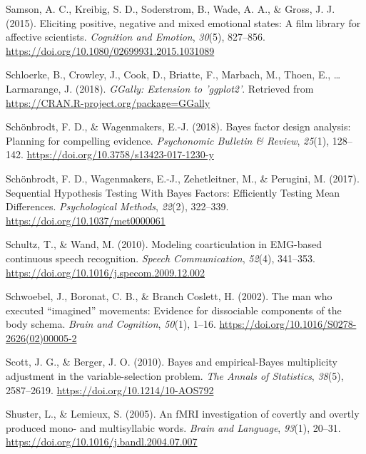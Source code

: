 \documentclass[a4paper,12pt,twoside,openright,oldfontcommands,final]{memoir}
\begin{document}
\leavevmode\hypertarget{ref-samson_eliciting_2015}{}%
Samson, A. C., Kreibig, S. D., Soderstrom, B., Wade, A. A., \& Gross, J. J. (2015). Eliciting positive, negative and mixed emotional states: A film library for affective scientists. \emph{Cognition and Emotion}, \emph{30}(5), 827--856. \url{https://doi.org/10.1080/02699931.2015.1031089}

\leavevmode\hypertarget{ref-R-GGally}{}%
Schloerke, B., Crowley, J., Cook, D., Briatte, F., Marbach, M., Thoen, E., \ldots{} Larmarange, J. (2018). \emph{GGally: Extension to 'ggplot2'}. Retrieved from \url{https://CRAN.R-project.org/package=GGally}

\leavevmode\hypertarget{ref-schonbrodt_bayes_2018}{}%
Schönbrodt, F. D., \& Wagenmakers, E.-J. (2018). Bayes factor design analysis: Planning for compelling evidence. \emph{Psychonomic Bulletin \& Review}, \emph{25}(1), 128--142. \url{https://doi.org/10.3758/s13423-017-1230-y}

\leavevmode\hypertarget{ref-schonbrodt_sequential_2017}{}%
Schönbrodt, F. D., Wagenmakers, E.-J., Zehetleitner, M., \& Perugini, M. (2017). Sequential Hypothesis Testing With Bayes Factors: Efficiently Testing Mean Differences. \emph{Psychological Methods}, \emph{22}(2), 322--339. \url{https://doi.org/10.1037/met0000061}

\leavevmode\hypertarget{ref-schultz_modeling_2010}{}%
Schultz, T., \& Wand, M. (2010). Modeling coarticulation in EMG-based continuous speech recognition. \emph{Speech Communication}, \emph{52}(4), 341--353. \url{https://doi.org/10.1016/j.specom.2009.12.002}

\leavevmode\hypertarget{ref-schwoebel_man_2002}{}%
Schwoebel, J., Boronat, C. B., \& Branch Coslett, H. (2002). The man who executed ``imagined'' movements: Evidence for dissociable components of the body schema. \emph{Brain and Cognition}, \emph{50}(1), 1--16. \url{https://doi.org/10.1016/S0278-2626(02)00005-2}

\leavevmode\hypertarget{ref-scott_bayes_2010}{}%
Scott, J. G., \& Berger, J. O. (2010). Bayes and empirical-Bayes multiplicity adjustment in the variable-selection problem. \emph{The Annals of Statistics}, \emph{38}(5), 2587--2619. \url{https://doi.org/10.1214/10-AOS792}

\leavevmode\hypertarget{ref-shuster_fmri_2005}{}%
Shuster, L., \& Lemieux, S. (2005). An fMRI investigation of covertly and overtly produced mono- and multisyllabic words. \emph{Brain and Language}, \emph{93}(1), 20--31. \url{https://doi.org/10.1016/j.bandl.2004.07.007}
\end{document}

